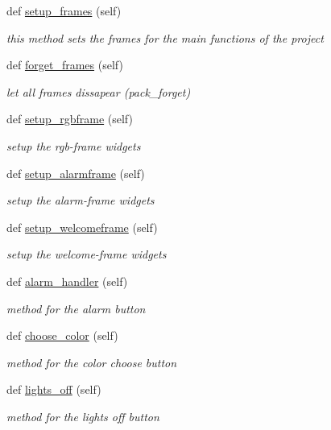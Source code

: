 \begin{DoxyCompactItemize}
def \mbox{\hyperlink{class_python___client_1_1_window_function_a1387df5915e23ef0d92a3e816d3f128b}{setup\+\_\+frames}} (self)
\begin{DoxyCompactList}\small\item\em this method sets the frames for the main functions of the project \end{DoxyCompactList}\item 
def \mbox{\hyperlink{class_python___client_1_1_window_function_a48e25dc456e930042a87bbec5239c458}{forget\+\_\+frames}} (self)
\begin{DoxyCompactList}\small\item\em let all frames dissapear (pack\+\_\+forget) \end{DoxyCompactList}\item 
def \mbox{\hyperlink{class_python___client_1_1_window_function_aab4df36ab3b25e679b67f09cde9d256d}{setup\+\_\+rgbframe}} (self)
\begin{DoxyCompactList}\small\item\em setup the rgb-\/frame widgets \end{DoxyCompactList}\item 
def \mbox{\hyperlink{class_python___client_1_1_window_function_a625d8169e5b5f11c4dd7df8611ff1ad0}{setup\+\_\+alarmframe}} (self)
\begin{DoxyCompactList}\small\item\em setup the alarm-\/frame widgets \end{DoxyCompactList}\item 
def \mbox{\hyperlink{class_python___client_1_1_window_function_a7973ce53af104391d4be0af460577b94}{setup\+\_\+welcomeframe}} (self)
\begin{DoxyCompactList}\small\item\em setup the welcome-\/frame widgets \end{DoxyCompactList}\item 
def \mbox{\hyperlink{class_python___client_1_1_window_function_af8c2258f6fc091b3fa7b077306f45b67}{alarm\+\_\+handler}} (self)
\begin{DoxyCompactList}\small\item\em method for the alarm button \end{DoxyCompactList}\item 
def \mbox{\hyperlink{class_python___client_1_1_window_function_a065ec1b6535adc5009029b90060ed44e}{choose\+\_\+color}} (self)
\begin{DoxyCompactList}\small\item\em method for the color choose button \end{DoxyCompactList}\item 
def \mbox{\hyperlink{class_python___client_1_1_window_function_a9b35486b2d7a0320f38feb86d568ed87}{lights\+\_\+off}} (self)
\begin{DoxyCompactList}\small\item\em method for the lights off button \end{DoxyCompactList}\end{DoxyCompactItemize}
